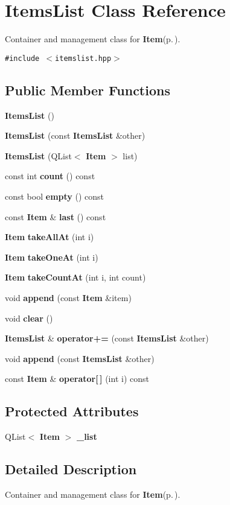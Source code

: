 \section{Items\-List Class Reference}
\label{classItemsList}
Container and management class for {\bf Item}{\rm (p.\,\pageref{classItem})}.  


{\tt \#include $<$itemslist.hpp$>$}

\subsection*{Public Member Functions}
\begin{CompactItemize}
\item 
{\bf Items\-List} ()
\item 
{\bf Items\-List} (const {\bf Items\-List} \&other)
\item 
{\bf Items\-List} (QList$<$ {\bf Item} $>$ list)
\item 
const int {\bf count} () const 
\item 
const bool {\bf empty} () const 
\item 
const {\bf Item} \& {\bf last} () const 
\item 
{\bf Item} {\bf take\-All\-At} (int i)
\item 
{\bf Item} {\bf take\-One\-At} (int i)
\item 
{\bf Item} {\bf take\-Count\-At} (int i, int count)
\item 
void {\bf append} (const {\bf Item} \&item)
\item 
void {\bf clear} ()
\item 
{\bf Items\-List} \& {\bf operator+=} (const {\bf Items\-List} \&other)
\item 
void {\bf append} (const {\bf Items\-List} \&other)
\item 
const {\bf Item} \& {\bf operator[$\,$]} (int i) const 
\end{CompactItemize}
\subsection*{Protected Attributes}
\begin{CompactItemize}
\item 
QList$<$ {\bf Item} $>$ {\bf \_\-list}
\end{CompactItemize}


\subsection{Detailed Description}
Container and management class for {\bf Item}{\rm (p.\,\pageref{classItem})}. 



